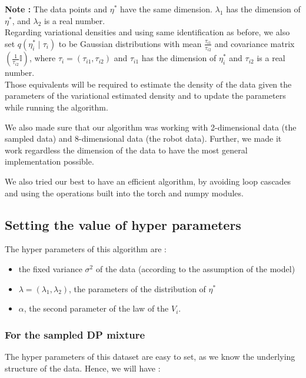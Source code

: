 \documentclass{article}
\begin{document}
\textbf{Note :} The data points and \(\eta^*\) have the same dimension. \(\lambda_1\) has the dimension of \(\eta^*\), and \(\lambda_2\) is a real number.\\

Regarding variational densities and using same identification as before, we also set \(q(\eta_i^* \mid \tau_i)\) to be Gaussian distributions with mean \(\frac{\tau_{i1}}{\tau_{i2}}\) and covariance matrix \(\left(\frac{1}{\tau_{i2}}\mathbb{I}\right)\), where $\tau_i = (\tau_{i1}, \tau_{i2})$ and $\tau_{i1}$ has the dimension of $\eta_i^*$ and $\tau_{i2}$ is a real number.\\

Those equivalents will be required to estimate the density of the data given the parameters of the variational estimated density and to update the parameters while running the algorithm.

We also made sure that our algorithm was working with 2-dimensional data (the sampled data) and 8-dimensional data (the robot data). Further, we made it work regardless the dimension of the data to have the most general implementation possible.

We also tried our best to have an efficient algorithm, by avoiding loop cascades and using the operations built into the torch and numpy modules.

\subsection{Setting the value of hyper parameters}

The hyper parameters of this algorithm are :

\begin{itemize}
    \item the fixed variance $\sigma^2$ of the data (according to the assumption of the model)
    \item $\lambda = (\lambda_1, \lambda_2)$, the parameters of the distribution of $\eta^*$
    \item $\alpha$, the second parameter of the law of the $V_i$.
\end{itemize}

\subsubsection{For the sampled DP mixture}
The hyper parameters of this dataset are easy to set, as we know the underlying structure of the data.
Hence, we will have :
\end{document}
